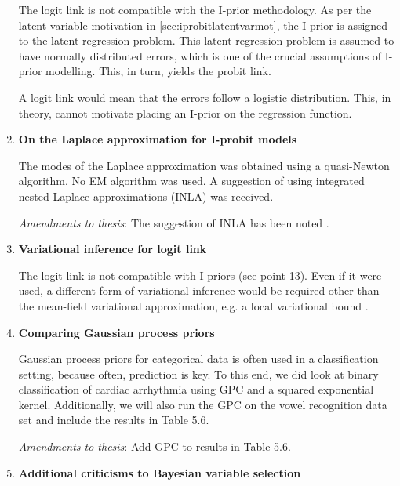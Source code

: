 \documentclass[11pt,showframe,twoside,openright]{report}
\begin{document}
\begin{enumerate}
  The logit link is not compatible with the I-prior methodology.
  As per the latent variable motivation in \cref{sec:iprobitlatentvarmot}, the I-prior is assigned to the latent regression problem.
  This latent regression problem is assumed to have normally distributed errors, which is one of the crucial assumptions of I-prior modelling.
  This, in turn, yields the probit link.
  
  A logit link would mean that the errors follow a logistic distribution.
  This, in theory, cannot motivate placing an I-prior on the regression function.
  

  \item \textbf{On the Laplace approximation for I-probit models}
  
  The modes of the Laplace approximation was obtained using a quasi-Newton algorithm.
  No EM algorithm was used. 
  A suggestion of using integrated nested Laplace approximations (INLA) was received.
  
  \textit{Amendments to thesis}: The suggestion of INLA has been noted .

  \item \textbf{Variational inference for logit link}

  The logit link is not compatible with I-priors (see point 13). 
  Even if it were used, a different form of variational inference would be required other than the mean-field variational approximation, e.g. a local variational bound \citep{bishop2006pattern}.
  
  \item \textbf{Comparing Gaussian process priors}

  Gaussian process priors for categorical data is often used in a classification setting, because often, prediction is key.
  To this end, we did look at binary classification of cardiac arrhythmia using GPC and a squared exponential kernel.
  Additionally, we will also run the GPC on the vowel recognition data set and include the results in Table 5.6.
  
  \textit{Amendments to thesis}: Add GPC to results in Table 5.6.
  
  \item \textbf{Additional criticisms to Bayesian variable selection}
  

\end{enumerate}
\end{document}
